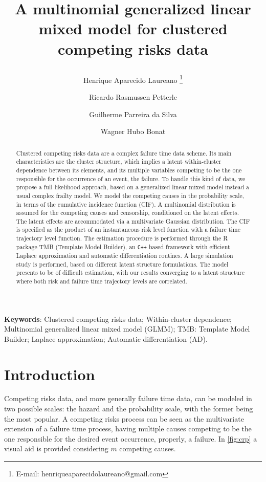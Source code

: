\documentclass[a4paper,12pt]{article}
\title{
  
  A multinomial generalized linear mixed model for clustered competing
  risks data

}
\author[1]{Henrique Aparecido Laureano
  \footnote{E-mail: henriqueaparecidolaureano@gmail.com}
}
\author[2]{Ricardo Rasmussen Petterle}
\author[3]{Guilherme Parreira da Silva}
\author[4]{Wagner Hubo Bonat}
\affil[1]{
  Instituto de Pesquisa Pel\'{e} Pequeno Pr\'{i}ncipe,
  Curitiba, Brasil
}
\affil[2]{
  Departamento de Medicina Integrada,
  Universidade Federal do Paran\'{a}, Curitiba, Brasil
}
\affil[3,4]{
  Laborat\'{o}rio de Estat\'{i}stica e Geoinforma\c{c}\~{a}o,
  Departamento de Estat\'{i}stica,
  Universidade Federal do Paran\'{a}, Curitiba, Brasil
}
\begin{document}
\maketitle

\begin{abstract}

  Clustered competing risks data are a complex failure time data
  scheme. Its main characteristics are the cluster structure, which
  implies a latent within-cluster dependence between its elements, and
  its multiple variables competing to be the one responsible for the
  occurrence of an event, the failure. To handle this kind of data, we
  propose a full likelihood approach, based on a generalized linear
  mixed model instead a usual complex frailty model. We model the
  competing causes in the probability scale, in terms of the cumulative
  incidence function (CIF). A multinomial distribution is assumed for
  the competing causes and censorship, conditioned on the latent
  effects. The latent effects are accommodated via a multivariate
  Gaussian distribution. The CIF is specified as the product of an
  instantaneous risk level function with a failure time trajectory level
  function. The estimation procedure is performed through the R package
  TMB (Template Model Builder), an \texttt{C++} based framework with
  efficient Laplace approximation and automatic differentiation
  routines. A large simulation study is performed, based on different
  latent structure formulations. The model presents to be of difficult
  estimation, with our results converging to a latent structure where
  both risk and failure time trajectory levels are correlated.

\end{abstract}
\vfill
\noindent\textbf{Keywords}: 
Clustered competing risks data;
Within-cluster dependence;
Multinomial generalized linear mixed model (GLMM);
TMB: Template Model Builder;
Laplace approximation;
Automatic differentiation (AD).
\vspace{0.2cm}
\newpage

\section{Introduction}

Competing risks data, and more generally failure time data, can be
modeled in two possible scales: the hazard and the probability scale,
with the former being the most popular. A competing risks process can be
seen as the multivariate extension of a failure time process, having
multiple causes competing to be the one responsible for the desired
event occurrence, properly, a failure. In \autoref{fig:crp} a visual aid
is provided considering \(m\) competing causes.
\end{document}
